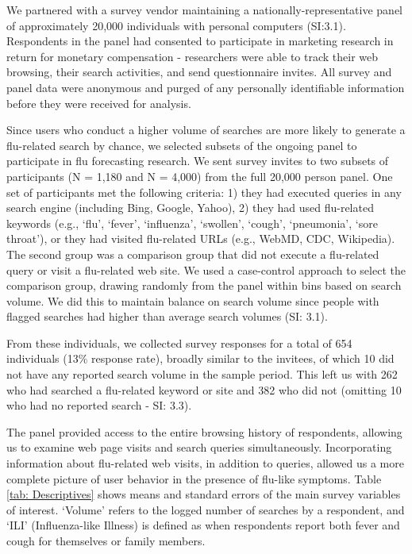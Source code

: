 \documentclass[fleqn,10pt]{wlscirep}
\begin{document}
We partnered with a survey vendor maintaining a nationally-representative panel of approximately 20,000 individuals with personal computers (SI:3.1). Respondents in the panel had consented to participate in marketing research in return for monetary compensation - researchers were able to track their web browsing, their search activities, and send questionnaire invites. All survey and panel data were anonymous and purged of any personally identifiable information before they were received for analysis. 

Since users who conduct a higher volume of searches are more likely to generate a flu-related search by chance, we selected subsets of the ongoing panel to participate in flu forecasting research. We sent survey invites to two subsets of participants (N = 1,180 and N = 4,000) from the full 20,000 person panel. One set of participants met the following criteria: 1) they had executed queries in any search engine (including Bing, Google, Yahoo), 2) they had used flu-related keywords (e.g., `flu', `fever', `influenza', `swollen', `cough', `pneumonia', `sore throat'), or they had visited flu-related URLs (e.g., WebMD, CDC, Wikipedia). The second group was a comparison group that did not execute a flu-related query or visit a flu-related web site. We used a case-control approach to select the comparison group, drawing randomly from the panel within bins based on search volume. We did this to maintain balance on search volume since people with flagged searches had higher than average search volumes (SI: 3.1).

From these individuals, we collected survey responses for a total of 654 individuals (13\% response rate), broadly similar to the invitees, of which 10 did not have any reported search volume in the sample period. This left us with 262 who had searched a flu-related keyword or site and 382 who did not (omitting 10 who had no reported search - SI: 3.3). 

The panel provided access to the entire browsing history of respondents, allowing us to examine web page visits and search queries simultaneously. Incorporating information about flu-related web visits, in addition to queries, allowed us a more complete picture of user behavior in the presence of flu-like symptoms. Table \ref{tab: Descriptives} shows means and standard errors of the main survey variables of interest. `Volume' refers to the logged number of searches by a respondent, and `ILI' (Influenza-like Illness) is defined as when respondents report both fever and cough for themselves or family members.
\end{document}
